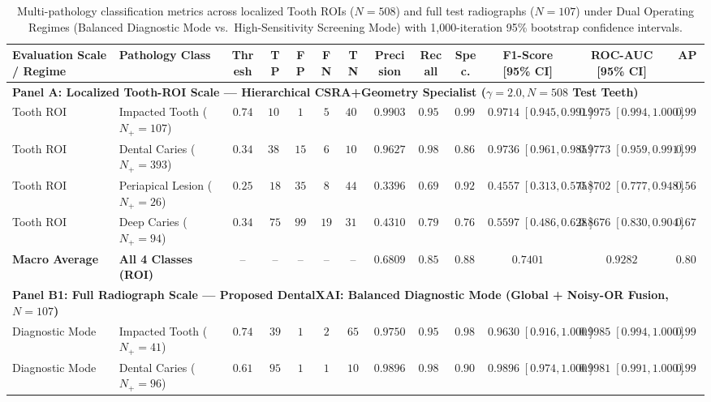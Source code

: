 \documentclass[review]{elsarticle}
\begin{document}
\begin{table}[t]
\centering
\caption{Multi-pathology classification metrics across localized Tooth ROIs ($N=508$) and full test radiographs ($N=107$) under Dual Operating Regimes (Balanced Diagnostic Mode vs.\ High-Sensitivity Screening Mode) with 1,000-iteration 95\% bootstrap confidence intervals.}
\label{tab:class_metrics}
\begin{adjustbox}{width=\textwidth}
\begin{tabular}{llccccccccccc}
\toprule
\textbf{Evaluation Scale / Regime} & \textbf{Pathology Class} & \textbf{Thresh} & \textbf{TP} & \textbf{FP} & \textbf{FN} & \textbf{TN} & \textbf{Precision} & \textbf{Recall} & \textbf{Spec.} & \textbf{F1-Score [95\% CI]} & \textbf{ROC-AUC [95\% CI]} & \textbf{AP} \\
\midrule
\multicolumn{13}{l}{\textbf{Panel A: Localized Tooth-ROI Scale --- Hierarchical CSRA+Geometry Specialist ($\gamma=2.0, N=508$ Test Teeth)}} \\
\midrule
Tooth ROI & Impacted Tooth ($N_+=107$) & $0.74$ & $102$ & $1$ & $5$ & $400$ & $0.9903$ & $0.9533$ & $0.9975$ & $0.9714\;[0.945, 0.991]$ & $0.9975\;[0.994, 1.000]$ & $0.9920$ \\
Tooth ROI & Dental Caries ($N_+=393$) & $0.34$ & $387$ & $15$ & $6$ & $100$ & $0.9627$ & $0.9847$ & $0.8696$ & $0.9736\;[0.961, 0.985]$ & $0.9773\;[0.959, 0.991]$ & $0.9921$ \\
Tooth ROI & Periapical Lesion ($N_+=26$) & $0.25$ & $18$ & $35$ & $8$ & $447$ & $0.3396$ & $0.6923$ & $0.9274$ & $0.4557\;[0.313, 0.575]$ & $0.8702\;[0.777, 0.948]$ & $0.5645$ \\
Tooth ROI & Deep Caries ($N_+=94$) & $0.34$ & $75$ & $99$ & $19$ & $315$ & $0.4310$ & $0.7979$ & $0.7609$ & $0.5597\;[0.486, 0.628]$ & $0.8676\;[0.830, 0.904]$ & $0.6717$ \\
\textbf{Macro Average} & \textbf{All 4 Classes (ROI)} & -- & -- & -- & -- & -- & $\mathbf{0.6809}$ & $\mathbf{0.8571}$ & $\mathbf{0.8889}$ & $\mathbf{0.7401}$ & $\mathbf{0.9282}$ & $\mathbf{0.8051}$ \\
\midrule
\multicolumn{13}{l}{\textbf{Panel B1: Full Radiograph Scale --- Proposed DentalXAI: Balanced Diagnostic Mode (Global + Noisy-OR Fusion, $N=107$)}} \\
\midrule
Diagnostic Mode & Impacted Tooth ($N_+=41$) & $0.74$ & $39$ & $1$ & $2$ & $65$ & $0.9750$ & $0.9512$ & $0.9848$ & $\mathbf{0.9630}\;[0.916, 1.000]$ & $\mathbf{0.9985}\;[0.994, 1.000]$ & $0.9977$ \\
Diagnostic Mode & Dental Caries ($N_+=96$) & $0.61$ & $95$ & $1$ & $1$ & $10$ & $0.9896$ & $0.9896$ & $0.9091$ & $\mathbf{0.9896}\;[0.974, 1.000]$ & $\mathbf{0.9981}\;[0.991, 1.000]$ & $0.9998$ \\

\end{tabular}
\end{adjustbox}
\end{table}
\end{document}
